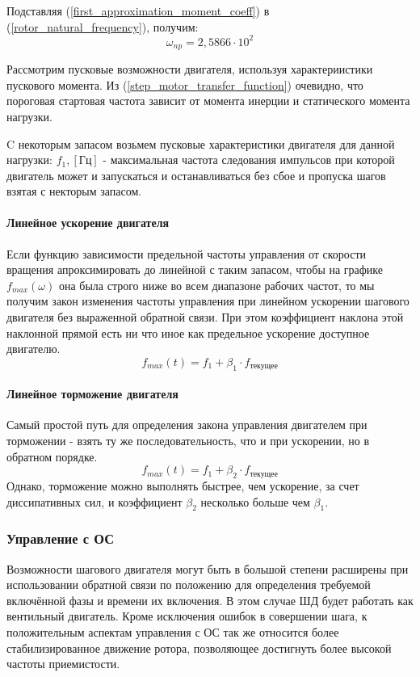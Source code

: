 Подставляя (\ref{first_approximation_moment_coeff}) в (\ref{rotor_natural_frequency}), получим:
\begin{equation}
    \label{first_approximation_rotor_natural_frequency}
    \omega_{np} = 2,5866 \cdot 10^{2}
\end{equation}

Рассмотрим пусковые возможности двигателя, используя характериистики пускового момента. Из
(\ref{step_motor_transfer_function}) очевидно, что пороговая стартовая частота зависит от момента инерции и
статического момента нагрузки.

C некоторым запасом возьмем пусковые характеристики двигателя для данной нагрузки:
$f_{1}, [\text{Гц}]$ - максимальная частота следования импульсов при которой двигатель может и
запускаться и останавливаться без сбое и пропуска шагов взятая с некторым запасом.

\paragraph{Линейное ускорение двигателя}
Если функцию зависимости предельной частоты управления от скорости вращения апроксимировать до
линейной с таким запасом, чтобы на графике $f_{max}( \omega )$ она была строго ниже во
всем диапазоне рабочих частот, то мы получим закон изменения частоты управления при линейном
ускорении шагового двигателя без выраженной обратной связи. При этом коэффициент наклона этой
наклонной прямой есть ни что иное как предельное ускорение доступное двигателю.
$$
    f_{max}(t) = f_{1} + \beta_{1} \cdot f_{\text{текущее}}
$$

\paragraph{Линейное торможение двигателя}
Самый простой путь для определения закона управления двигателем при торможении - взять ту же
последовательность, что и при ускорении, но в обратном порядке.
$$
    f_{max}(t) = f_{1} + \beta_{2} \cdot f_{\text{текущее}}
$$
Однако, торможение можно выполнять быстрее, чем ускорение, за счет диссипативных сил,
и коэффициент $\beta_{2}$ несколько больше чем $\beta_{1}$.

\newpage
\subsubsection{Управление с ОС}
Возможности шагового двигателя могут быть в большой степени расширены при использовании обратной
связи по положению для определения требуемой включённой фазы и времени их включения. В этом случае ШД
будет работать как вентильный двигатель. Кроме исключения ошибок в совершении шага, к положительным
аспектам управления с ОС так же относится более стабилизированное движение ротора, позволяющее достигнуть
более высокой частоты приемистости.

